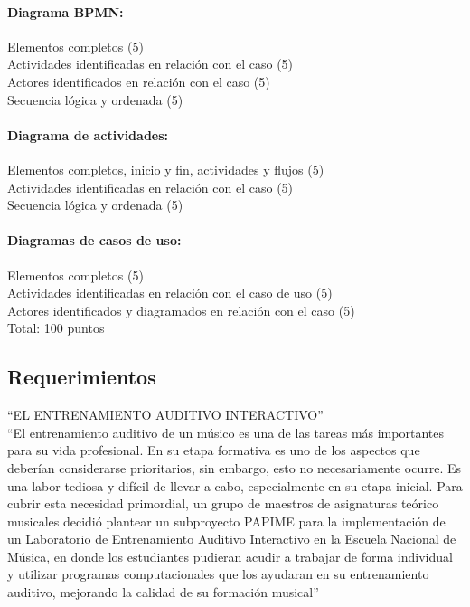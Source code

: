 \documentclass[spanish,12pt,letterpapper]{article}
\begin{document}
\paragraph{Diagrama BPMN:\\} 
Elementos completos (5)\\
Actividades identificadas en relación con el caso (5)\\
Actores identificados en relación con el caso (5)\\
Secuencia lógica y ordenada (5)\\
\paragraph{Diagrama de actividades:\\} 
Elementos completos, inicio y fin, actividades y flujos (5)\\
Actividades identificadas en relación con el caso (5)\\
Secuencia lógica y ordenada (5)\\
\paragraph{Diagramas de casos de uso:\\} 
Elementos completos (5)\\
Actividades identificadas en relación con el caso de uso (5)\\
Actores identificados y diagramados en relación con el caso (5)\\
Total: 100 puntos
	
	\subsection{Requerimientos}
	
	``EL ENTRENAMIENTO AUDITIVO INTERACTIVO''\\
	
	``El entrenamiento auditivo de un músico es una de las tareas más importantes para su vida profesional. En su etapa formativa es uno de los aspectos que deberían considerarse prioritarios, sin embargo, esto no necesariamente ocurre. Es una labor tediosa y difícil de llevar a cabo, especialmente en su etapa inicial. Para cubrir esta necesidad primordial, un grupo de maestros de asignaturas teórico musicales decidió plantear un subproyecto PAPIME para la implementación de un Laboratorio de Entrenamiento Auditivo Interactivo en la Escuela Nacional de Música, en donde los estudiantes pudieran acudir a trabajar de forma individual y utilizar programas computacionales que los ayudaran en su entrenamiento auditivo, mejorando la calidad de su formación musical''
	
\end{document}
